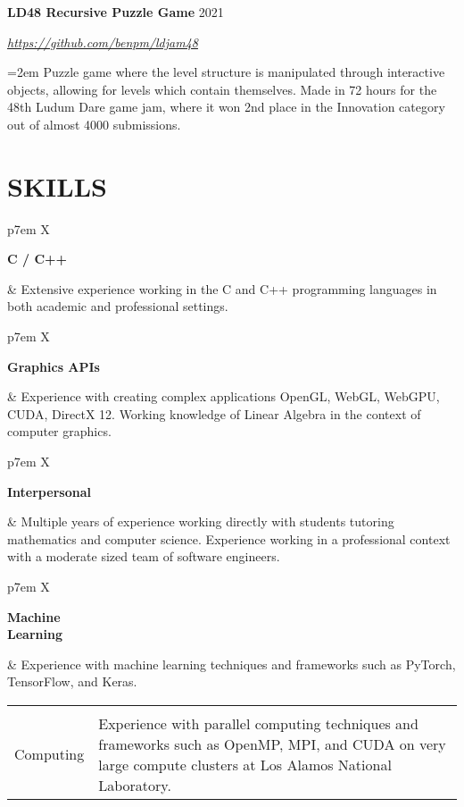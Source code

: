 \documentclass[paper=a4,fontsize=11pt]{scrartcl} %
\newlength{\spacebox}
\newcommand{\sepspace}{\vspace*{1em}}		%
\newcommand{\sym}{\raisebox{1pt}{$\blacktriangleright$}}
\newcommand{\showurl}[1]{\href{#1}{#1}}
\newcommand{\NewPart}[1]{\section*{\sym \mbox{} \MakeUppercase{#1}}}
\newcommand{\PersonalEntry}[2]{
		\noindent\hangindent=2em\hangafter=0 %
		\parbox{\spacebox}{        %
		\textit{#1}}		       %
		\hspace{1.5em} #2 \par
		\sepspace}
\newcommand{\SkillsEntry}[2]{      %
		\noindent
		\begin{tabularx}{\linewidth}{ p{7em} X }
			\noindent
			\begin{minipage}[t]{7em}
				\textbf{#1}
			\end{minipage} &
			\noindent \normalfont \small #2
		\end{tabularx}
		\sepspace}
\newcommand{\EducationEntry}[5]{
		\Large \noindent \textbf{#1} \hfill \\   %
		\normalsize \noindent \textit{#2} \hfill	  %
		\colorbox{yel}{\color{blk}#3} \par  %
		\noindent \textit{#4} \par        %
		\noindent\hangindent=2em\hangafter=0 \small #5 %
		\normalsize \par
		\sepspace}
\newcommand{\WorkEntry}[4]{				  %
		\noindent \textbf{#1} \hfill      %
		\colorbox{yel}{\color{blk}#2} \par  %
		\noindent \textit{#3} \par              %
		\noindent\hangindent=2em\hangafter=0 \small #4 %
		\normalsize \par
		\sepspace}
\begin{document}
\WorkEntry{LD48 Recursive Puzzle Game}{2021}{\showurl{https://github.com/benpm/ldjam48}}{
	Puzzle game where the level structure is manipulated through interactive objects,
	allowing for levels which contain themselves.
	Made in 72 hours for the 48th Ludum Dare game jam, where it won 2nd place in the Innovation category
	out of almost 4000 submissions.
}



\NewPart{Skills}{}

\SkillsEntry{C / C++}{
	Extensive experience working in the C and C++ programming languages in both academic and professional settings.
}

\SkillsEntry{Graphics APIs}{
	Experience with creating complex applications OpenGL, WebGL, WebGPU, CUDA, DirectX 12. Working knowledge of Linear Algebra in the context of computer graphics.
}

\SkillsEntry{Interpersonal}{
	Multiple years of experience working directly with students tutoring mathematics and computer science. Experience working in a professional context with a moderate sized team of software engineers.
}

\SkillsEntry{Machine\\Learning}{
	Experience with machine learning techniques and frameworks such as PyTorch, TensorFlow, and Keras.
}

\SkillsEntry{Parallel\\Computing}{
	Experience with parallel computing techniques and frameworks such as OpenMP, MPI, and CUDA on very large compute clusters at Los Alamos National Laboratory.
}
\end{document}
